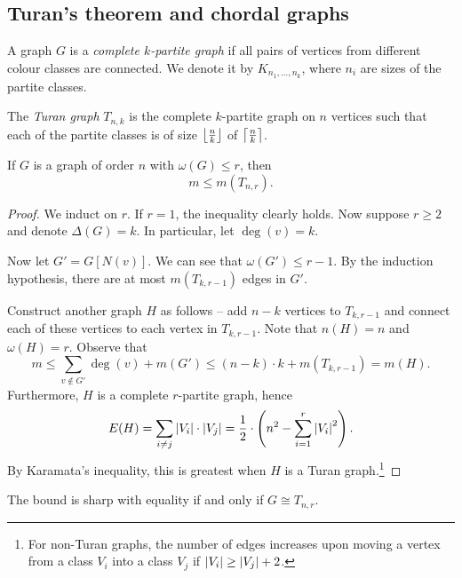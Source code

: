 \newpage

\subsection{Turan's theorem and chordal graphs}

\begin{definicija}
A graph $G$ is a
\emph{complete $k$-partite graph}
if all pairs of vertices from different colour classes are
connected. We denote it by $K_{n_1, \dots, n_k}$, where $n_i$ are
sizes of the partite classes.
\end{definicija}

\begin{definicija}
The \emph{Turan graph} $T_{n,k}$ is the complete
$k$-partite graph on $n$ vertices such that each of the partite
classes is of size $\left\lfloor \frac{n}{k}\right\rfloor$ of $\left\lceil \frac{n}{k}\right\rceil$.
\end{definicija}

\begin{izrek}[Turan]
If $G$ is a graph of order $n$ with $\omega(G) \leq r$, then
\[
m \leq m(T_{n,r}).
\]
\end{izrek}

\begin{proof}
We induct on $r$. If $r = 1$, the inequality clearly holds. Now
suppose $r \geq 2$ and denote $\Delta(G) = k$. In particular, let
$\deg(v) = k$.

Now let $G' = G[N(v)]$. We can see that $\omega(G') \leq r-1$. By
the induction hypothesis, there are at most
$m(T_{k,r-1})$ edges in $G'$.

Construct another graph $H$ as follows -- add $n-k$ vertices to
$T_{k,r-1}$ and connect each of these vertices to each vertex in
$T_{k,r-1}$. Note that $n(H) = n$ and $\omega(H) = r$. Observe that
\[
m \leq
\sum_{v \not \in G'} \deg(v) + m(G') \leq
(n-k) \cdot k + m(T_{k,r-1}) =
m(H).
\]
Furthermore, $H$ is a complete $r$-partite graph, hence
\[
E(H) =
\sum_{i \ne j} \left\lvert V_i\right\rvert \cdot \left\lvert V_j\right\rvert =
\frac{1}{2} \cdot \left(n^2 - \sum_{i=1}^r \left\lvert V_i\right\rvert^2\right).
\]
By Karamata's inequality, this is greatest when $H$ is a Turan
graph.\footnote{For non-Turan graphs, the number of edges increases
upon moving a vertex from a class $V_i$ into a class $V_j$ if
$\left\lvert V_i\right\rvert \geq \left\lvert V_j\right\rvert+2$.}
\end{proof}

\begin{opomba}
The bound is sharp with equality if and only if $G \cong T_{n,r}$.
\end{opomba}

